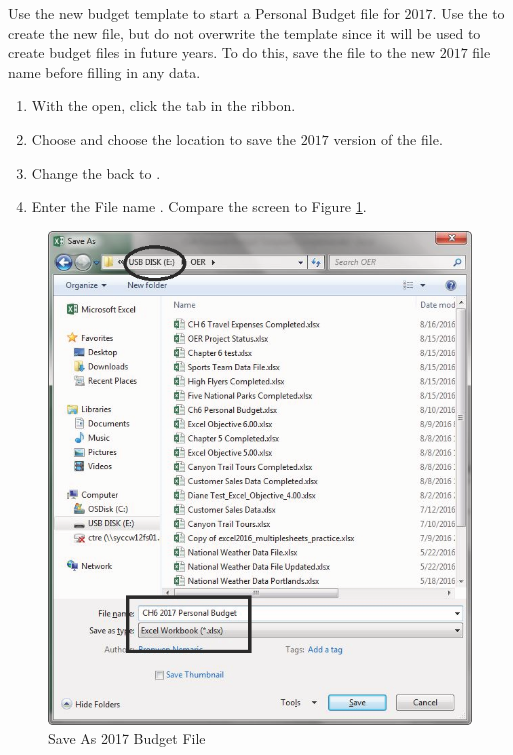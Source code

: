 Use the new budget template to start a Personal Budget file for $ 2017 $. Use the  to create the new file, but do not overwrite the template since it will be used to create budget files in future years. To do this, save the file to the new $ 2017 $ file name before filling in any data.

\begin{enumerate}
	\item With the  open, click the  tab in the ribbon.
	\item Choose  and choose the location to save the $ 2017 $ version of the file.
	\item Change the  back to .
	\item Enter the File name . Compare the screen to Figure \ref{06:fig12}.
\end{enumerate}

\begin{figure}[H]
	\centering
	\includegraphics[width=\maxwidth{.95\linewidth}]{gfx/ch06_fig12}
	\caption{Save As 2017 Budget File}
	\label{06:fig12}
\end{figure}

